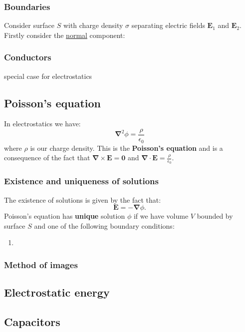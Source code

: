 \documentclass{article}
\begin{document}
\subsubsection{Boundaries}
Consider surface $S$ with charge density $\sigma$
separating electric fields $\boldsymbol{E}_1$ and
$\boldsymbol{E}_2$.
Firstly consider the \underline{normal} component: 

\subsubsection{Conductors}
special case for electrostatics

\newpage

\subsection{Poisson's equation}
In electrostatics we have:
$$\boldsymbol{\nabla}^2\phi=\frac{\rho}{\epsilon_0}$$
where $\rho$ is our charge density. This is the \textbf{Poisson's equation}
and is a consequence of the fact that
$\boldsymbol{\nabla}\times\boldsymbol{E}=\boldsymbol{0}$ and
$\boldsymbol{\nabla}\cdot\boldsymbol{E}=\displaystyle\frac{\rho}{\epsilon_0}$.

\subsubsection{Existence and uniqueness of solutions}
The existence of solutions is given by the fact that:
$$\boldsymbol{E}=-\boldsymbol{\nabla}\phi.$$
Poisson's equation has \textbf{unique} solution $\phi$
if we have volume $V$ bounded by surface $S$
and one of the following boundary conditions:
\begin{enumerate}
    \item 
\end{enumerate}

\subsubsection{Method of images}

\subsection{Electrostatic energy}

\newpage

\subsection{Capacitors}
\end{document}
